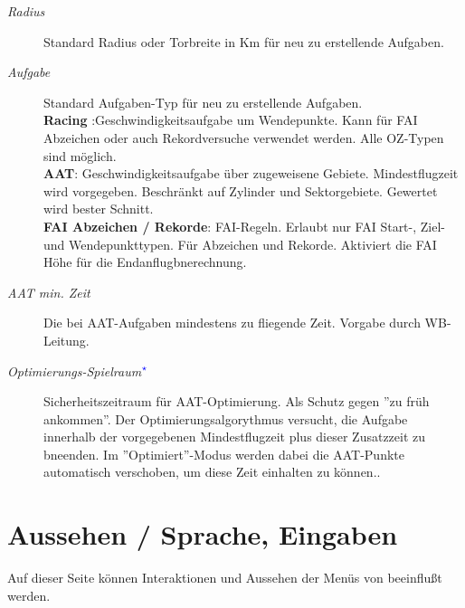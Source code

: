 \begin{description}
\item[\textit{Radius}] Standard Radius oder Torbreite in Km für neu zu erstellende Aufgaben.
\item[\textit{Aufgabe}] Standard Aufgaben-Typ für neu zu erstellende Aufgaben.\\
{\bf Racing }:Geschwindigkeitsaufgabe um Wendepunkte. Kann für FAI Abzeichen oder auch Rekordversuche  verwendet werden. Alle OZ-Typen sind möglich.\\
{\bf  AAT}: Geschwindigkeitsaufgabe über zugeweisene Gebiete. Mindestflugzeit wird vorgegeben. Beschränkt auf Zylinder und Sektorgebiete. Gewertet wird bester Schnitt.\\
{\bf  FAI Abzeichen / Rekorde}: FAI-Regeln. Erlaubt nur FAI Start-, Ziel- und Wendepunkttypen. Für Abzeichen und Rekorde. Aktiviert die FAI Höhe für die Endanflugbnerechnung.
\item[\textit{AAT min. Zeit}] Die bei AAT-Aufgaben mindestens zu fliegende Zeit. Vorgabe durch WB-Leitung.
\item[\textit{Optimierungs-Spielraum$^{\textcolor{blue}{\star}}$}] Sicherheitszeitraum für AAT-Optimierung.
Als Schutz gegen ''zu früh ankommen''. Der Optimierungsalgorythmus versucht, die Aufgabe innerhalb der vorgegebenen Mindestflugzeit plus dieser Zusatzzeit zu bneenden.
Im ''Optimiert''-Modus  werden dabei die AAT-Punkte automatisch verschoben, um diese Zeit einhalten zu können..
\end{description}


\section{Aussehen / Sprache, Eingaben}\label{sec:interface}

Auf dieser Seite können Interaktionen und Aussehen der Menüs von \xc beeinflußt werden.


